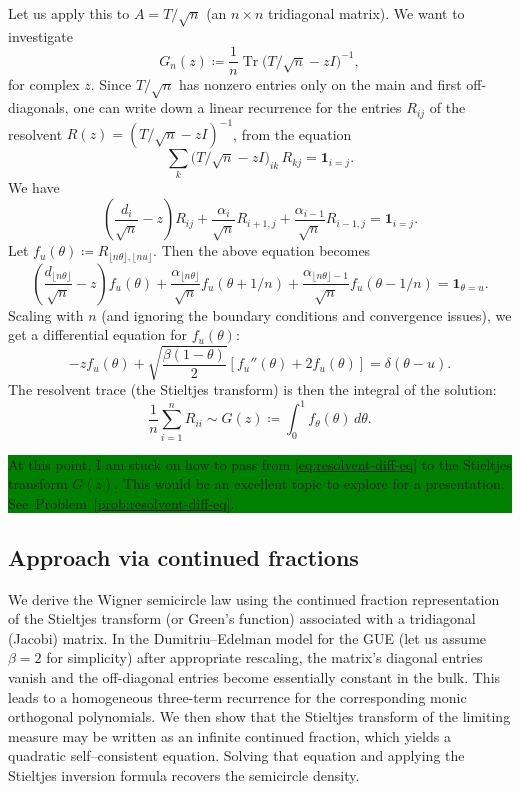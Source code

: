 \documentclass[letterpaper,11pt,oneside,reqno]{article}
\numberwithin{equation}{section}
\theoremstyle{definition}
\begin{document}
Let us apply this to \(A = T/\sqrt{n}\) (an $n\times n$ tridiagonal matrix).  We want
to investigate
\[
	G_n(z)\coloneqq \frac{1}{n}
	\operatorname{Tr}
  \bigl(T/\sqrt{n} - zI\bigr)^{-1},
\]
for complex \(z\).
 Since $T/\sqrt{n}$ has nonzero entries only on the main and first off-diagonals, one can write down a linear recurrence for the entries
$R_{ij}$
of the resolvent
$R(z)=(T/\sqrt{n}-z I)^{-1}$,
from the equation
\[
	\sum_{k}
	\bigl(T/\sqrt{n} - zI\bigr)_{ik}\,R_{kj}
  =
	\mathbf{1}_{i=j}.
\]
We have
\begin{equation*}
	\left(\frac{d_i}{\sqrt{n}}-z\right)R_{ij}
	+
	\frac{\alpha_i}{\sqrt{n}}R_{i+1,j}
	+
	\frac{\alpha_{i-1}}{\sqrt{n}}R_{i-1,j}=
	\mathbf{1}_{i=j}.
\end{equation*}
Let $f_u(\theta)\coloneqq R_{\lfloor n\theta \rfloor ,\lfloor nu \rfloor }$.
Then the above equation becomes
\begin{equation*}
	\left(\frac{d_{\lfloor n\theta \rfloor }}{\sqrt{n}}-z\right)f_u(\theta)
	+
	\frac{\alpha_{\lfloor n\theta \rfloor }}{\sqrt{n}}f_u(\theta+1/n)
	+
	\frac{\alpha_{\lfloor n \theta \rfloor -1}}{\sqrt{n}}f_u(\theta-1/n)=
	\mathbf{1}_{\theta=u}.
\end{equation*}
Scaling with $n$ (and ignoring the boundary conditions and convergence issues), we get
a differential equation for $f_u(\theta)$:
\begin{equation}
	\label{eq:resolvent-diff-eq}
	-z f_u(\theta)+\sqrt{\frac{\beta(1-\theta)}{2}}
	\left[f_u''(\theta)+2f_u(\theta)\right]=\delta(\theta-u).
\end{equation}
The resolvent trace (the Stieltjes transform)
is then the integral of the solution:
\begin{equation*}
	\frac{1}{n}\sum_{i=1}^{n}R_{ii}
	\sim
	G(z)\coloneqq
	\int_0^1 f_\theta(\theta)\,d\theta.
\end{equation*}

\colorbox{green}{\parbox{.7\textwidth}{At this point, I am stuck on how to pass from
\eqref{eq:resolvent-diff-eq} to the Stieltjes transform $G(z)$.
This would be an excellent topic to explore for a presentation.
See~Problem~\ref{prob:resolvent-diff-eq}.}}


\subsection{Approach via continued fractions}
\label{sub:continued-fractions}

We derive the Wigner semicircle law using the continued
fraction representation of the Stieltjes transform (or
Green's function) associated with a tridiagonal (Jacobi)
matrix. In the Dumitriu--Edelman model for the GUE (let us
assume \(\beta=2\) for simplicity) after appropriate
rescaling, the matrix’s diagonal entries vanish and the
off-diagonal entries become essentially constant in the
bulk. This leads to a homogeneous three-term recurrence for
the corresponding monic orthogonal polynomials. We then show
that the Stieltjes transform of the limiting measure may be
written as an infinite continued fraction, which yields a
quadratic self--consistent equation. Solving that equation
and applying the Stieltjes inversion formula recovers the
semicircle density.
\end{document}
